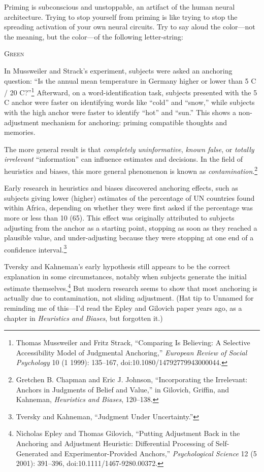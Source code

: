 {
 Priming is subconscious and unstoppable, an artifact of the human
neural architecture. Trying to stop yourself from priming is like
trying to stop the spreading activation of your own neural circuits.
Try to say aloud the color---not the meaning, but the color---of the
following letter-string:\newline
}

{\centering
\color{red} \textsc{Green}
\par}


\bigskip

{
 In Mussweiler and Strack's experiment, subjects
were asked an anchoring question: ``Is the annual mean
temperature in Germany higher or lower than 5 C / 20
C?''\footnote{Thomas Mussweiler and Fritz Strack,
``Comparing Is Believing: A Selective Accessibility
Model of Judgmental Anchoring,'' \textit{European
Review of Social Psychology} 10 (1 1999): 135--167,
doi:10.1080/14792779943000044.} Afterward, on a
word-identification task, subjects presented with the 5 C anchor were
faster on identifying words like
``cold'' and
``snow,'' while subjects with the
high anchor were faster to identify
``hot'' and
``sun.'' This shows a non-adjustment
mechanism for anchoring: priming compatible thoughts and memories.}

{
 The more general result is that \textit{completely uninformative},
\textit{known false}, or \textit{totally irrelevant}
``information'' can influence
estimates and decisions. In the field of heuristics and biases, this
more general phenomenon is known as
\textit{contamination}.\footnote{Gretchen B. Chapman and Eric J. Johnson,
``Incorporating the Irrelevant: Anchors in Judgments
of Belief and Value,'' in Gilovich, Griffin, and
Kahneman, \textit{Heuristics and Biases}, 120--138.}}

{
 Early research in heuristics and biases discovered anchoring
effects, such as subjects giving lower (higher) estimates of the
percentage of UN countries found within Africa, depending on whether
they were first asked if the percentage was more or less than 10 (65).
This effect was originally attributed to subjects adjusting from the
anchor as a starting point, stopping as soon as they reached a
plausible value, and under-adjusting because they were stopping at one
end of a confidence interval.\footnote{Tversky and Kahneman, ``Judgment Under
Uncertainty.''}}

{
 Tversky and Kahneman's early hypothesis still
appears to be the correct explanation in some circumstances, notably
when subjects generate the initial estimate
themselves.\footnote{Nicholas Epley and Thomas Gilovich, ``Putting
Adjustment Back in the Anchoring and Adjustment Heuristic: Differential
Processing of Self-Generated and Experimentor-Provided
Anchors,'' \textit{Psychological Science} 12 (5
2001): 391--396, doi:10.1111/1467-9280.00372.} But modern research seems to show that
most anchoring is actually due to contamination, not sliding
adjustment. (Hat tip to Unnamed for reminding me of
this---I'd read the Epley and Gilovich paper years ago,
as a chapter in \textit{Heuristics and Biases}, but forgotten it.)}

